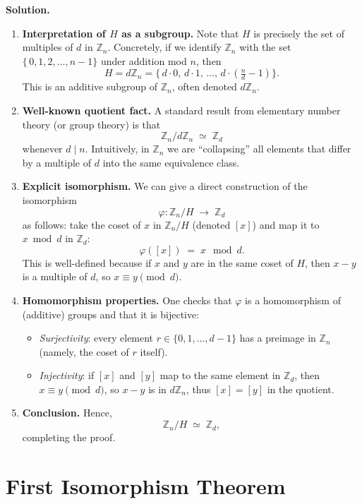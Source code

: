 \documentclass[12pt]{article}
\theoremstyle{definition} %
\theoremstyle{plain} %
\begin{document}
\textbf{Solution.}

\begin{enumerate}
  \item \textbf{Interpretation of $H$ as a subgroup.} Note that $H$ is precisely the set of multiples of $d$ in $\mathbb{Z}_n$. Concretely, if we identify $\mathbb{Z}_n$ with the set $\{\,0,1,2,\ldots,n-1\}$ under addition mod $n$, then
  \[
    H = d\mathbb{Z}_n = \{\,d \cdot 0,\, d \cdot 1,\, \ldots,\, d \cdot (\tfrac{n}{d}-1)\}.
  \]
  This is an additive subgroup of $\mathbb{Z}_n$, often denoted $d\mathbb{Z}_n$.
  
  \item \textbf{Well-known quotient fact.} A standard result from elementary number theory (or group theory) is that
  \[
    \mathbb{Z}_n / d\mathbb{Z}_n \; \simeq \; \mathbb{Z}_d
  \]
  whenever $d\mid n$. Intuitively, in $\mathbb{Z}_n$ we are ``collapsing'' all elements that differ by a multiple of $d$ into the same equivalence class.

  \item \textbf{Explicit isomorphism.}
  We can give a direct construction of the isomorphism
  \[
    \varphi \colon \mathbb{Z}_n / H \;\to\; \mathbb{Z}_d
  \]
  as follows: take the coset of $x$ in $\mathbb{Z}_n / H$ (denoted $[x]$) and map it to $x \bmod d$ in $\mathbb{Z}_d$:
  \[
    \varphi([x]) \;=\; x \mod d.
  \]
  This is well-defined because if $x$ and $y$ are in the same coset of $H$, then $x - y$ is a multiple of $d$, so $x \equiv y \pmod{d}$. 

  \item \textbf{Homomorphism properties.} One checks that $\varphi$ is a homomorphism of (additive) groups and that it is bijective:
    \begin{itemize}
      \item \emph{Surjectivity}: every element $r \in \{0,1,\dots,d-1\}$ has a preimage in $\mathbb{Z}_n$ (namely, the coset of $r$ itself). 
      \item \emph{Injectivity}: if $[x]$ and $[y]$ map to the same element in $\mathbb{Z}_d$, then $x \equiv y \pmod{d}$, so $x-y$ is in $d\mathbb{Z}_n$, thus $[x] = [y]$ in the quotient. 
    \end{itemize}
  
  \item \textbf{Conclusion.} Hence, 
  \[
    \mathbb{Z}_n / H \;\simeq\; \mathbb{Z}_d,
  \]
  completing the proof.
\end{enumerate}

\section*{First Isomorphism Theorem}
\end{document}
